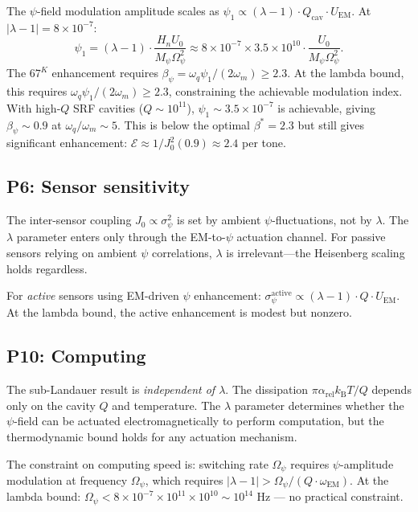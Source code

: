\documentclass[11pt]{article}
\theoremstyle{definition}
\theoremstyle{remark}
\newcommand{\kB}{k_{\mathrm{B}}}
\begin{document}
The $\psi$-field modulation amplitude scales as $\psi_1 \propto
(\lambda - 1) \cdot Q_{\mathrm{cav}} \cdot U_{\mathrm{EM}}$. At
$|\lambda - 1| = 8\times 10^{-7}$:
\begin{equation}
\psi_1 = (\lambda-1) \cdot \frac{H_n U_0}{M_\psi \Omega_\psi^2}
\approx 8\times 10^{-7} \times 3.5\times 10^{10} \cdot
\frac{U_0}{M_\psi\Omega_\psi^2}.
\end{equation}
The $67^K$ enhancement requires $\beta_\psi = \omega_q \psi_1 /
(2\omega_m) \geq 2.3$. At the lambda bound, this requires
$\omega_q \psi_1 / (2\omega_m) \geq 2.3$, constraining the
achievable modulation index. With high-$Q$ SRF cavities
($Q \sim 10^{11}$), $\psi_1 \sim 3.5\times 10^{-7}$ is achievable,
giving $\beta_\psi \sim 0.9$ at $\omega_q/\omega_m \sim 5$. This is
below the optimal $\beta^* = 2.3$ but still gives significant
enhancement: $\mathcal{E} \approx 1/J_0^2(0.9) \approx 2.4$ per tone.

\subsection{P6: Sensor sensitivity}

The inter-sensor coupling $J_0 \propto \sigma_\psi^2$ is set by
ambient $\psi$-fluctuations, not by $\lambda$. The $\lambda$ parameter
enters only through the EM-to-$\psi$ actuation channel. For passive
sensors relying on ambient $\psi$ correlations, $\lambda$ is
irrelevant---the Heisenberg scaling holds regardless.

For \emph{active} sensors using EM-driven $\psi$ enhancement:
$\sigma_\psi^{\mathrm{active}} \propto (\lambda - 1) \cdot Q \cdot
U_{\mathrm{EM}}$. At the lambda bound, the active enhancement is modest
but nonzero.

\subsection{P10: Computing}

The sub-Landauer result is \emph{independent of $\lambda$}. The
dissipation $\pi\alpha_{\mathrm{rel}}\kB T/Q$ depends only on the
cavity $Q$ and temperature. The $\lambda$ parameter determines whether
the $\psi$-field can be actuated electromagnetically to perform
computation, but the thermodynamic bound holds for any actuation
mechanism.

The constraint on computing speed is: switching rate $\Omega_\psi$
requires $\psi$-amplitude modulation at frequency $\Omega_\psi$, which
requires $|\lambda - 1| > \Omega_\psi / (Q \cdot \omega_{\mathrm{EM}})$.
At the lambda bound: $\Omega_\psi < 8\times 10^{-7} \times 10^{11}
\times 10^{10} \sim 10^{14}$ Hz --- no practical constraint.
\end{document}
